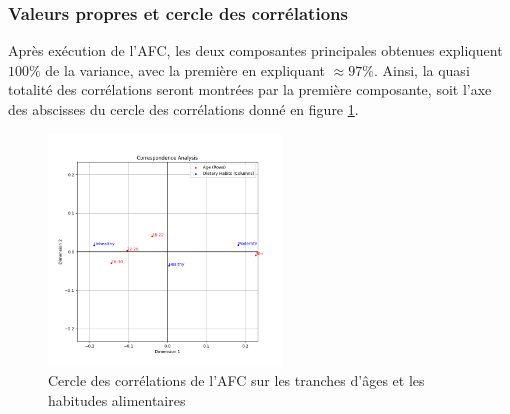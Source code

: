 \subsubsection{Valeurs propres et cercle des corrélations}

Après exécution de l'AFC, les deux composantes principales obtenues expliquent $100\%$ de la variance, avec la première en expliquant $\approx 97\%$.
Ainsi, la quasi totalité des corrélations seront montrées par la première composante, soit l'axe des abscisses du cercle des corrélations donné en figure \ref{fig:corrAgeDiretary}.

\begin{figure}[!h]
  \begin{center}
    \includegraphics[width=0.55\textwidth]{Images/Age_Dietary_all/Corr_circle.png}
  \end{center}
  \caption{Cercle des corrélations de l'AFC sur les tranches d'âges et les habitudes alimentaires}
  \label{fig:corrAgeDiretary}
\end{figure}

